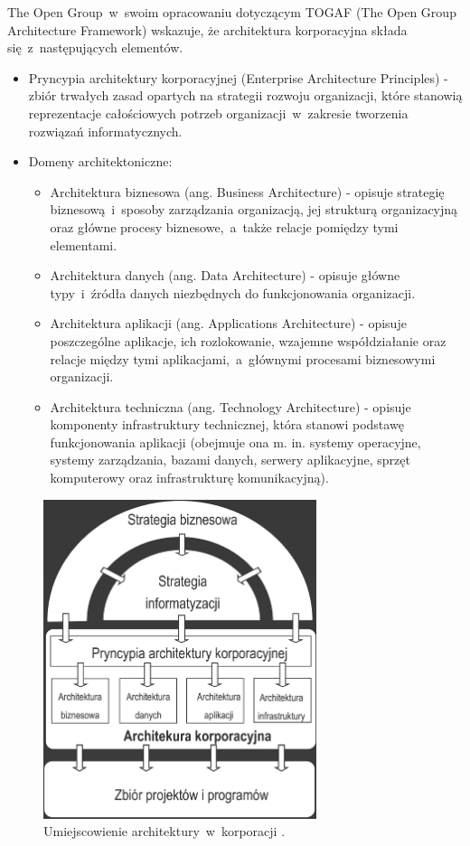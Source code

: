 The Open Group~w~swoim opracowaniu dotyczącym TOGAF (The Open Group Architecture Framework) wskazuje, że architektura korporacyjna składa się~z~następujących elementów.
\begin{itemize}
\item{Pryncypia architektury korporacyjnej (Enterprise Architecture Principles) - zbiór trwałych zasad opartych na strategii rozwoju organizacji, które stanowią reprezentacje całościowych potrzeb organizacji~w~zakresie tworzenia rozwiązań informatycznych.}
\item{Domeny architektoniczne:
\begin{itemize}
\item{Architektura biznesowa (ang. Business Architecture) - opisuje strategię biznesową~i~sposoby zarządzania organizacją, jej strukturą organizacyjną oraz główne procesy biznesowe,~a~także relacje pomiędzy tymi elementami.}
\item{Architektura danych (ang. Data Architecture) - opisuje główne typy~i~źródła danych niezbędnych do funkcjonowania organizacji.}
\item{Architektura aplikacji (ang. Applications Architecture) - opisuje poszczególne aplikacje, ich rozlokowanie, wzajemne współdziałanie oraz relacje między tymi aplikacjami,~a~głównymi procesami biznesowymi organizacji.}
\item{Architektura techniczna (ang. Technology Architecture) - opisuje komponenty infrastruktury technicznej, która stanowi podstawę funkcjonowania aplikacji (obejmuje ona m. in. systemy operacyjne, systemy zarządzania, bazami danych, serwery aplikacyjne, sprzęt komputerowy oraz infrastrukturę komunikacyjną).}
\end{itemize}
}
\end{itemize}

\begin{figure}[h!tbp]
\begin{centering}
\includegraphics[width=8cm]{img/ea.png}
\caption[Umiejscowienie architektury~w~korporacji.]{Umiejscowienie architektury~w~korporacji \cite{SOMAArsIBMJour}.}\label{ea_arch}
\end{centering}
\end{figure}

